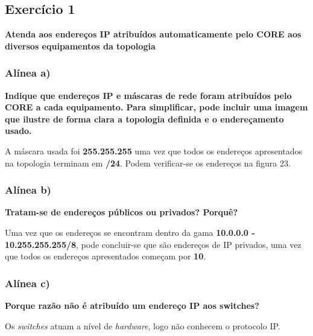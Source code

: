 \documentclass{article}
\begin{document}
\subsection{Exercício 1}
\textbf{Atenda aos endereços IP atribuídos automaticamente pelo CORE aos diversos equipamentos da topologia}
\subsubsection{Alínea a)}
\textbf{Indique que endereços IP e máscaras de rede foram atribuídos pelo CORE a cada equipamento. Para simplificar, pode incluir uma imagem que ilustre de forma clara a topologia definida e o endereçamento usado.}\par\vspace{0.35cm}

\hspace{0.5cm}A máscara usada foi \textbf{255.255.255} uma vez que todos os endereços apresentados na topologia terminam em \textbf{/24}. Podem verificar-se os endereços na figura 23.\par\vspace{0.35cm}

\subsubsection{Alínea b)}
\textbf{Tratam-se de endereços públicos ou privados? Porquê?}\par\vspace{0.2cm}
\hspace{0.5cm}Uma vez que os endereços se encontram dentro da gama \textbf{10.0.0.0 - 10.255.255.255/8}, pode concluir-se que são endereços de IP privados, uma vez que todos os endereços apresentados começam por \textbf{10}.\par\vspace{0.35cm}

\subsubsection{Alínea c)}

\textbf{Porque razão não é atribuído um endereço IP aos switches?}\par \vspace{0.2 cm}
\hspace{0.5 cm}Os \textit{switches} atuam a nível de \textit{hardware}, logo não conhecem o protocolo IP.\par\vspace{7cm}
\end{document}

